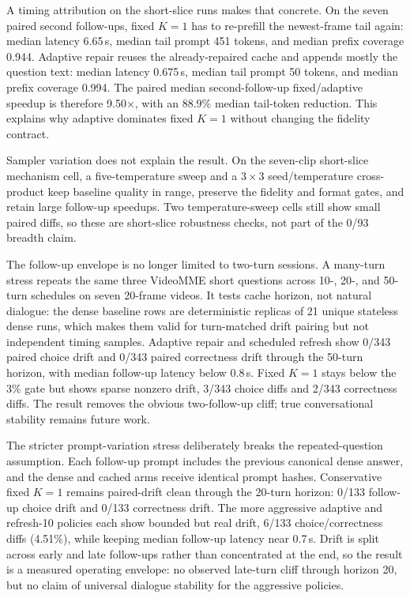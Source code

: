 A timing attribution on the short-slice runs makes that concrete.
On the seven paired second follow-ups, fixed \(K=1\) has to re-prefill the
newest-frame tail again: median latency 6.65\,s, median tail prompt
451 tokens, and median prefix coverage 0.944. Adaptive repair reuses the
already-repaired cache and appends mostly the question text: median latency
0.675\,s, median tail prompt 50 tokens, and median prefix coverage 0.994. The
paired median second-follow-up fixed/adaptive speedup is therefore
9.50$\times$, with an 88.9\% median tail-token reduction. This explains why
adaptive dominates fixed \(K=1\) without changing the fidelity contract.

Sampler variation does not explain the result. On the seven-clip short-slice
mechanism cell, a five-temperature sweep and a \(3\times3\) seed/temperature
cross-product keep baseline quality in range, preserve the fidelity and format
gates, and retain large follow-up speedups. Two temperature-sweep cells still
show small paired diffs, so these are short-slice robustness checks, not part
of the 0/93 breadth claim.





The follow-up envelope is no longer limited to two-turn sessions. A many-turn
stress repeats the same three VideoMME short questions across 10-, 20-, and
50-turn schedules on seven 20-frame videos. It tests cache horizon, not natural
dialogue: the dense baseline rows are deterministic replicas of 21 unique
stateless dense runs, which makes them valid for turn-matched drift pairing but
not independent timing samples. Adaptive repair and scheduled refresh show
0/343 paired choice drift and 0/343 paired correctness drift through the
50-turn horizon, with median follow-up latency below 0.8\,s. Fixed \(K=1\)
stays below the 3\% gate but shows sparse nonzero drift, 3/343 choice diffs and
2/343 correctness diffs. The result removes the obvious two-follow-up cliff;
true conversational stability remains future work.



The stricter prompt-variation stress deliberately breaks the repeated-question
assumption. Each follow-up prompt includes the previous canonical dense answer,
and the dense and cached arms receive identical prompt hashes. Conservative
fixed \(K=1\) remains paired-drift clean through the 20-turn horizon:
0/133 follow-up choice drift and 0/133 correctness drift. The more aggressive
adaptive and refresh-10 policies each show bounded but real drift, 6/133
choice/correctness diffs (4.51\%), while keeping median follow-up latency near
0.7\,s. Drift is split across early and late follow-ups rather than
concentrated at the end, so the result is a measured operating envelope: no
observed late-turn cliff through horizon 20, but no claim of universal dialogue
stability for the aggressive policies.

